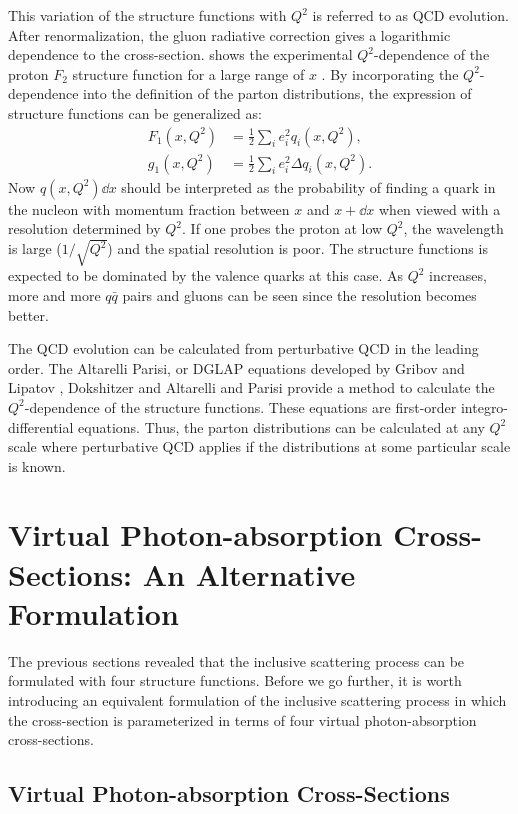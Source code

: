 This variation of the structure functions with $Q^2$ is referred to as QCD evolution. After renormalization, the gluon radiative correction gives a logarithmic dependence to the cross-section.  shows the experimental $Q^2$-dependence of the proton $F_2$ structure function for a large range of $x$ \cite{Olive2014}. By incorporating the $Q^2$-dependence into the definition of the parton distributions, the expression of structure functions can be generalized as:
\begin{align} \label{C2S3E12}
F_1(x,Q^2) & = \frac{1}{2}\sum_ie_i^2q_i(x,Q^2), \\ \label{C2S3E13}
g_1(x,Q^2) & = \frac{1}{2}\sum_ie_i^2\Delta q_i(x,Q^2).
\end{align}
Now $q(x,Q^2)\dd{x}$ should be interpreted as the probability of finding a quark in the nucleon with momentum fraction between $x$ and $x+\dd{x}$ when viewed with a resolution determined by $Q^2$. If one probes the proton at low $Q^2$, the wavelength is large ($1/\sqrt{Q^2}$) and the spatial resolution is poor. The structure functions is expected to be dominated by the valence quarks at this case. As $Q^2$ increases, more and more $q\bar{q}$ pairs and gluons can be seen since the resolution becomes better.

The QCD evolution can be calculated from perturbative QCD in the leading order. The Altarelli Parisi, or DGLAP equations developed by Gribov and Lipatov \cite{Gribov1972}, Dokshitzer \cite{Dokshitzer1977} and Altarelli and Parisi \cite{Altarelli1977} provide a method to calculate the $Q^2$-dependence of the structure functions. These equations are first-order integro-differential equations. Thus, the parton distributions can be calculated at any $Q^2$ scale where perturbative QCD applies if the distributions at some particular scale is known.

\section{Virtual Photon-absorption Cross-Sections: An Alternative Formulation}
\label{C2S4}

The previous sections revealed that the inclusive scattering process can be formulated with four structure functions. Before we go further, it is worth introducing an equivalent formulation of the inclusive scattering process in which the cross-section is parameterized in terms of four virtual photon-absorption cross-sections.

\subsection{Virtual Photon-absorption Cross-Sections}
\label{C2S4SS1}

